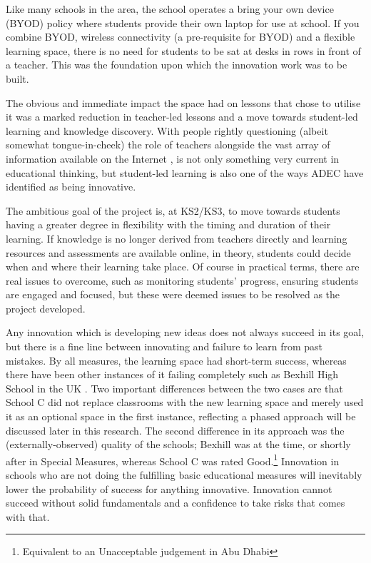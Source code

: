 Like many schools in the area, the school operates a bring your own device (BYOD) policy where students provide their own laptop for use at school. If you combine BYOD, wireless connectivity (a pre-requisite for BYOD) and a flexible learning space, there is no need for students to be sat at desks in rows in front of a teacher. This was the foundation upon which the innovation work was to be built.

The obvious and immediate impact the space had on lessons that chose to utilise it was a marked reduction in teacher-led lessons and a move towards student-led learning and knowledge discovery. With people rightly questioning (albeit somewhat tongue-in-cheek) the role of teachers alongside the vast array of information available on the Internet \cite{gilbert2010need}, is not only something very current in educational thinking, but student-led learning is also one of the ways ADEC have identified as being innovative.

The ambitious goal of the project is, at KS2/KS3, to move towards students having a greater degree in flexibility with the timing and duration of their learning. If knowledge is no longer derived from teachers directly and learning resources and assessments are available online, in theory, students could decide when and where their learning take place. Of course in practical terms, there are real issues to overcome, such as monitoring students' progress, ensuring students are engaged and focused, but these were deemed issues to be resolved as the project developed.

Any innovation which is developing new ideas does not always succeed in its goal, but there is a fine line between innovating and failure to learn from past mistakes. By all measures, the learning space had short-term success, whereas there have been other instances of it failing completely such as Bexhill High School in the UK \cite{Lusher2015}. Two important differences between the two cases are that School C did not replace classrooms with the new learning space and merely used it as an optional space in the first instance, reflecting a phased approach will be discussed later in this research. The second difference in its approach was the (externally-observed) quality of the schools; Bexhill was at the time, or shortly after in Special Measures, whereas School C was rated Good.\footnote{Equivalent to an Unacceptable judgement in Abu Dhabi} Innovation in schools who are not doing the fulfilling basic educational measures will inevitably lower the probability of success for anything innovative. Innovation cannot succeed without solid fundamentals and a confidence to take risks that comes with that.

